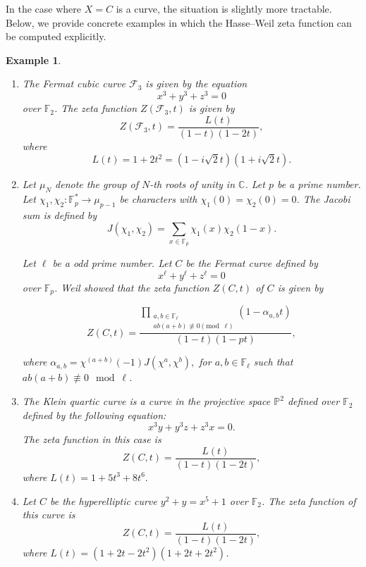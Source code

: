 \documentclass[12pt]{amsart}
\newtheorem{example}[theorem]{Example}
\begin{document}
In the case where $X = C$ is a curve, the situation is slightly more tractable. Below, we provide concrete examples in which the Hasse--Weil zeta function can be computed explicitly.
\begin{example}
\item 
\begin{enumerate}

\item

The Fermat cubic curve $\mathcal{F}_3$ is given by the equation
\[
x^3 + y^3 + z^3 = 0
\]
over $\mathbb{F}_2$.  The  zeta function $Z(\mathcal{F}_3, t)$ is given by
\[
Z(\mathcal{F}_3, t) = \frac{L(t)}{(1 - t)(1 - 2t)},
\]
where
\[
L(t) = 1 + 2t^2 = (1 - i\sqrt{2}t)(1 + i\sqrt{2}t).
\]

\item 
Let $\mu_N$ denote the group of $N$-th roots of unity in $\mathbb{C}$.  Let $p$ be a prime number. Let $\chi_1, \chi_2 : \mathbb{F}_p^* \to \mu_{p-1}$ be characters with $\chi_1(0)=\chi_2(0) = 0$. The Jacobi sum is defined by
\[
J(\chi_1, \chi_2) = \sum_{x \in \mathbb{F}_p} \chi_1(x) \chi_2(1 - x).
\]
 
Let $\ell$ be a odd prime number.  
Let $C$ be the Fermat curve defined by
\[
x^\ell + y^\ell + z^\ell = 0
\]
over $\mathbb{F}_p$. Weil  showed that the zeta function $Z(C, t)$ of $C$ is given by


\[
Z(C, t) = \frac{
    \displaystyle\prod_{\substack{a, b \in \mathbb{F}_\ell \\ ab(a + b) \not\equiv 0 \pmod{\ell}}}
    (1 - \alpha_{a,b} t)
}{
    (1 - t)(1 - pt)
},
\]

where $
\alpha_{a,b} = \chi^{(a+b)}(-1) J(\chi^a, \chi^b),
$
for $a, b \in \mathbb{F}_\ell$ such that $ab(a + b) \not\equiv 0 \mod \ell$.

\item The Klein quartic curve
is a 
 curve in the projective space $\mathbb{P}^2$ defined  over $\mathbb{F}_2$ defined by the following  equation:
\[
x^3 y + y^3 z + z^3 x = 0.
\]
The zeta function in this case is
\[
Z(C, t) = \frac{L(t)}{(1 - t)(1 - 2t)},
\]
where $
L(t) = 1 + 5t^3 + 8t^6.$
\item  Let $C$ be the hyperelliptic curve $y^2 + y = x^5 + 1$ over $\mathbb{F}_2$.
The  zeta function of this curve is
\[
Z(C,t) = \frac{L(t)}{(1-t)(1-2t)},
\]
where $L(t)=(1+2t-2t^2)(1+2t+2t^2)$.
\end{enumerate}
\end{example}

\end{document}
